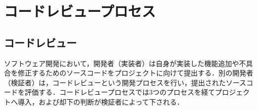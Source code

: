 \documentclass[11pt]{jreport}
\newcommand{\RQOne}{レビューコメントの中から修正要求を抽出することは可能か}
\newcommand{\RQTwo}{レビューコメントの中から修正確認を抽出することは可能か}
\newcommand{\RQThree}{コードレビュー票単位と修正要求単位に基づくタスクの完了状況評価結果は異なるか}
\begin{document}






\chapter{コードレビュープロセス}\label{chap:review_process}

\section{コードレビュー}
ソフトウェア開発において，開発者（実装者）は自身が実装した機能追加や不具合を修正するためのソースコードをプロジェクトに向けて提出する．別の開発者（検証者）は，コードレビューという開発プロセスを行い，提出されたソースコードを評価する．コードレビュープロセスでは3つのプロセスを経てプロジェクトへ導入，および却下の判断が検証者によって下される．
\end{document}
